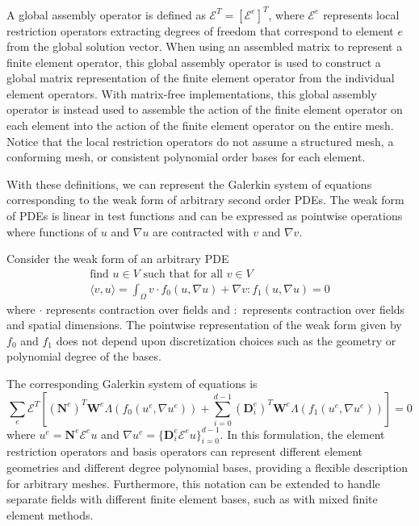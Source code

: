 A global assembly operator is defined as $\mathcal{E}^T = \left[ \mathcal{E}^e \right]^T$, where $\mathcal{E}^e$ represents local restriction operators extracting degrees of freedom that correspond to element $e$ from the global solution vector.
When using an assembled matrix to represent a finite element operator, this global assembly operator is used to construct a global matrix representation of the finite element operator from the individual element operators.
With matrix-free implementations, this global assembly operator is instead used to assemble the action of the finite element operator on each element into the action of the finite element operator on the entire mesh.
Notice that the local restriction operators do not assume a structured mesh, a conforming mesh, or consistent polynomial order bases for each element.

With these definitions, we can represent the Galerkin system of equations corresponding to the weak form of arbitrary second order PDEs.
The weak form of PDEs is linear in test functions and can be expressed as pointwise operations where functions of $u$ and $\nabla u$ are contracted with $v$ and $\nabla v$.

Consider the weak form of an arbitrary PDE
\begin{equation}
\begin{array}{c}
\text{find } u \in V \text{ such that for all } v \in V\\
\langle v, u \rangle = \int_{\Omega} v \cdot f_0 \left( u, \nabla u \right) + \nabla v : f_1 \left( u, \nabla u \right) = 0
\end{array}
\label{eq:weak_form}
\end{equation}
where $\cdot$ represents contraction over fields and $:$ represents contraction over fields and spatial dimensions.
The pointwise representation of the weak form given by $f_0$ and $f_1$ does not depend upon discretization choices such as the geometry or polynomial degree of the bases.

The corresponding Galerkin system of equations is
\begin{equation}
\sum_e \mathcal{E}^T \left[ \left( \mathbf{N}^e \right)^T \mathbf{W}^e \Lambda \left( f_0 \left( u^e, \nabla u^e \right) \right) + \sum_{i = 0}^{d - 1} \left( \mathbf{D}_i^e \right)^T \mathbf{W}^e \Lambda \left( f_1 \left( u^e, \nabla u^e \right) \right) \right] = 0
\label{eq:galerkin_form}
\end{equation}
where $u^e = \mathbf{N}^e \mathcal{E}^e u$ and $\nabla u^e = \lbrace \mathbf{D}_i^e \mathcal{E}^e u \rbrace_{i = 0}^{d - 1}$.
In this formulation, the element restriction operators and basis operators can represent different element geometries and different degree polynomial bases, providing a flexible description for arbitrary meshes.
Furthermore, this notation can be extended to handle separate fields with different finite element bases, such as with mixed finite element methods.

